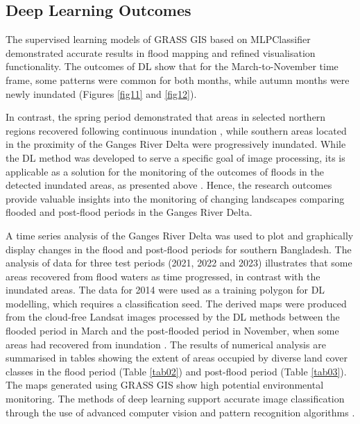 \documentclass[water,article,accept,pdftex,oneauhor]{Definitions/mdpi}
\begin{document}
\subsection{Deep Learning Outcomes}

The supervised learning models of GRASS GIS based on MLPClassifier demonstrated accurate results in flood mapping and refined visualisation functionality{. The outcomes of DL show} that for the March-to-November time frame, some patterns were common for both months, while autumn months were newly inundated (Figures \ref{fig11} and  \ref{fig12}). 

In contrast, the spring period demonstrated that areas in selected northern regions recovered following continuous inundation%
, while southern areas located in the proximity of the Ganges River Delta were progressively inundated. While the {DL} method was developed to serve a specific goal of image processing, its is applicable as a solution for the monitoring of {the} outcomes of floods in {the} detected inundated areas{, }as presented above%
. Hence, the research outcomes provide {valuable} insights into {the monitoring of }changing landscapes {comparing flooded and} post-flood periods in {the} Ganges River Delta. 

A time series analysis of the Ganges River Delta was used to plot and graphically display{ }changes in the flood and post-flood periods for southern Bangladesh{. The analysis of data }for three test periods (2021, 2022 and 2023) illustrates that some areas recovered from flood waters as time progressed, in contrast with the inundated areas. The data for 2014 were used as a training polygon for {DL} modelling, which requires a classification seed. The derived maps were produced from the cloud-free Landsat images processed by the {DL} methods between the flooded period in March and the post-flooded period in November, when some areas had recovered from inundation%
. The results of numerical analysis are summarised in tables showing the extent of areas occupied by diverse land cover classes in the flood period (Table \ref{tab02}) and post-flood period (Table \ref{tab03}). The maps generated using GRASS GIS show high potential environmental monitoring. The methods of deep learning support accurate image classification through the use of advanced computer vision and pattern recognition algorithms%
. 
\end{document}
